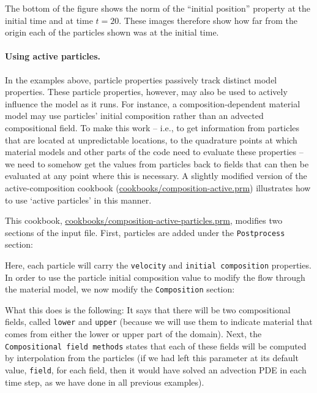 \documentclass{article}
\begin{document}
The bottom of the figure shows the norm of the ``initial position'' property at
the initial time and at time $t=20$. These images therefore show how far from
the origin each of the particles shown was at the initial time.


\paragraph{Using active particles.}
In the examples above, particle properties passively track distinct
model properties.  These particle properties, however, may also be used
to actively influence the model as it runs.  For instance, a
composition-dependent material model may use particles' initial
composition rather than an advected compositional field. To make this
work -- i.e., to get information from particles that are located at
unpredictable locations, to the quadrature
points at which material models and other parts of the code need to
evaluate these properties -- we need to somehow get the values from
particles back to fields that can then be evaluated at any point where
this is necessary.
A slightly modified version of the active-composition cookbook (\url{cookbooks/composition-active.prm}) illustrates how to use `active particles' in this manner.

This cookbook, \url{cookbooks/composition-active-particles.prm}, modifies two sections of the input file.  First, particles are added under the \texttt{Postprocess} section: 


Here, each particle will carry the \texttt{velocity} and
\texttt{initial composition} properties.  In order to use the particle initial composition value to modify the flow through the material model, we now modify the \texttt{Composition} section:


 
What this does is the following: It says that there will be two
compositional fields, called \texttt{lower} and \texttt{upper}
(because we will use them to indicate material that comes from either
the lower or upper part of the domain). Next, the
\texttt{Compositional field methods} states that each of these fields
will be computed by interpolation from the particles (if we had left
this parameter at its default value, \texttt{field}, for each field,
then it would have solved an advection PDE in each time step, as we
have done in all previous examples).
\end{document}
